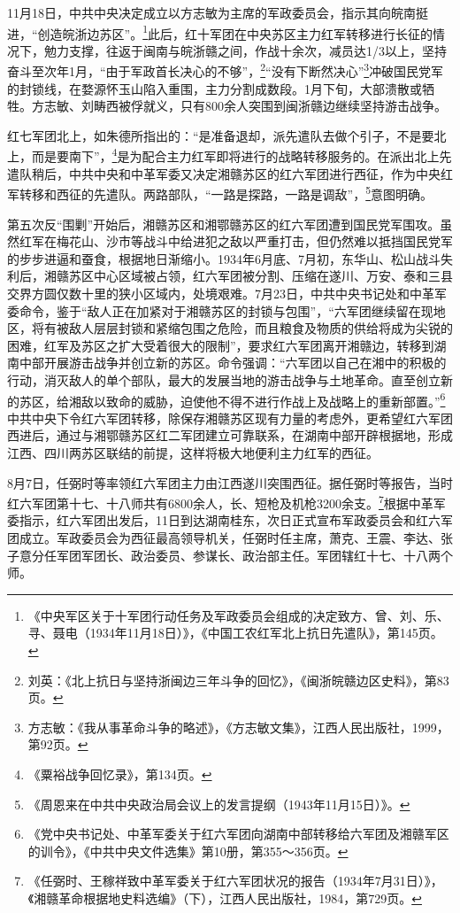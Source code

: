 11月18日，中共中央决定成立以方志敏为主席的军政委员会，指示其向皖南挺进，“创造皖浙边苏区”。\footnote{《中央军区关于十军团行动任务及军政委员会组成的决定致方、曾、刘、乐、寻、聂电（1934年11月18日）》，《中国工农红军北上抗日先遣队》，第145页。}此后，红十军团在中央苏区主力红军转移进行长征的情况下，勉力支撑，往返于闽南与皖浙赣之间，作战十余次，减员达1/3以上，坚持奋斗至次年1月，“由于军政首长决心的不够”，\footnote{刘英：《北上抗日与坚持浙闽边三年斗争的回忆》，《闽浙皖赣边区史料》，第83页。}“没有下断然决心”\footnote{方志敏：《我从事革命斗争的略述》，《方志敏文集》，江西人民出版社，1999，第92页。}冲破国民党军的封锁线，在婺源怀玉山陷入重围，主力分割成数段。1月下旬，大部溃散或牺牲。方志敏、刘畴西被俘就义，只有800余人突围到闽浙赣边继续坚持游击战争。


红七军团北上，如朱德所指出的：“是准备退却，派先遣队去做个引子，不是要北上，而是要南下”，\footnote{《粟裕战争回忆录》，第134页。}是为配合主力红军即将进行的战略转移服务的。在派出北上先遣队稍后，中共中央和中革军委又决定湘赣苏区的红六军团进行西征，作为中央红军转移和西征的先遣队。两路部队，“一路是探路，一路是调敌”，\footnote{《周恩来在中共中央政治局会议上的发言提纲（1943年11月15日）》。}意图明确。


第五次反“围剿”开始后，湘赣苏区和湘鄂赣苏区的红六军团遭到国民党军围攻。虽然红军在梅花山、沙市等战斗中给进犯之敌以严重打击，但仍然难以抵挡国民党军的步步进逼和蚕食，根据地日渐缩小。1934年6月底、7月初，东华山、松山战斗失利后，湘赣苏区中心区域被占领，红六军团被分割、压缩在遂川、万安、泰和三县交界方圆仅数十里的狭小区域内，处境艰难。7月23日，中共中央书记处和中革军委命令，鉴于“敌人正在加紧对于湘赣苏区的封锁与包围”，“六军团继续留在现地区，将有被敌人层层封锁和紧缩包围之危险，而且粮食及物质的供给将成为尖锐的困难，红军及苏区之扩大受着很大的限制”，要求红六军团离开湘赣边，转移到湖南中部开展游击战争并创立新的苏区。命令强调：“六军团以自己在湘中的积极的行动，消灭敌人的单个部队，最大的发展当地的游击战争与土地革命。直至创立新的苏区，给湘敌以致命的威胁，迫使他不得不进行作战上及战略上的重新部置。”\footnote{《党中央书记处、中革军委关于红六军团向湖南中部转移给六军团及湘赣军区的训令》，《中共中央文件选集》第10册，第355～356页。}中共中央下令红六军团转移，除保存湘赣苏区现有力量的考虑外，更希望红六军团西进后，通过与湘鄂赣苏区红二军团建立可靠联系，在湖南中部开辟根据地，形成江西、四川两苏区联结的前提，这样将极大地便利主力红军的西征。


8月7日，任弼时等率领红六军团主力由江西遂川突围西征。据任弼时等报告，当时红六军团第十七、十八师共有6800余人，长、短枪及机枪3200余支。\footnote{《任弼时、王稼祥致中革军委关于红六军团状况的报告（1934年7月31日）》，《湘赣革命根据地史料选编》（下），江西人民出版社，1984，第729页。}根据中革军委指示，红六军团出发后，11日到达湖南桂东，次日正式宣布军政委员会和红六军团成立。军政委员会为西征最高领导机关，任弼时任主席，萧克、王震、李达、张子意分任军团军团长、政治委员、参谋长、政治部主任。军团辖红十七、十八两个师。


